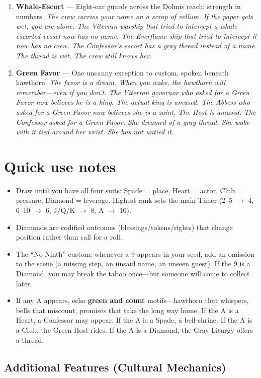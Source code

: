 \begin{enumerate}
\item[K] \textbf{Whale-Escort} --- Eight-oar guards across the Dolmis reach; strength in numbers.
  \hfill \textit{The crew carries your name on a scrap of vellum. If the paper gets wet, you are alone. The Viterran warship that tried to intercept a whale-escorted vessel now has no name. The Everflame ship that tried to intercept it now has no crew. The Confessor's escort has a gray thread instead of a name. The thread is wet. The crew still knows her.}
\item[A] \textbf{Green Favor} --- One uncanny exception to custom, spoken beneath hawthorn.
  \hfill \textit{The favor is a dream. When you wake, the hawthorn will remember---even if you don't. The Viterran governor who asked for a Green Favor now believes he is a king. The actual king is amused. The Abbess who asked for a Green Favor now believes she is a saint. The Host is amused. The Confessor asked for a Green Favor. She dreamed of a gray thread. She woke with it tied around her wrist. She has not untied it.}
\end{enumerate}

\section*{Quick use notes}
\label{sec:theona-quick-use}
\begin{itemize}
\item Draw until you have all four suits: Spade = place, Heart = actor, Club = pressure, Diamond = leverage. Highest rank sets the main Timer (2--5 $\rightarrow$ 4, 6--10 $\rightarrow$ 6, J/Q/K $\rightarrow$ 8, A $\rightarrow$ 10).
\item Diamonds are codified outcomes (blessings/tokens/rights) that change position rather than call for a roll.
\item The ``No Ninth'' custom: whenever a 9 appears in your seed, add an omission to the scene (a missing step, an unsaid name, an unseen guest). If the 9 is a Diamond, you may break the taboo once---but someone will come to collect later.
\item If any A appears, echo \textbf{green and count} motifs---hawthorn that whispers, bells that miscount, promises that take the long way home. If the A is a Heart, a Confessor may appear. If the A is a Spade, a bell-shrine. If the A is a Club, the Green Host rides. If the A is a Diamond, the Gray Liturgy offers a thread.
\end{itemize}

\subsection*{Additional Features (Cultural Mechanics)}
\label{sec:theona-mechanics}

